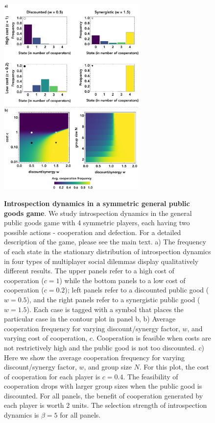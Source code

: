 \documentclass[11pt]{article}
\theoremstyle{plainCl1}
\theoremstyle{plainCl2}
\begin{document}
\clearpage
\begin{figure}
\centering
\includegraphics[width =  0.65\textwidth, keepaspectratio]{figures/figure3.eps}~\\[0.4cm]
\caption{\onehalfspacing
\textbf{Introspection dynamics in a symmetric general public goods game}. We study introspection dynamics in the general public goods game with 4 symmetric players, each having two possible actions - cooperation and defection. For a detailed description of the game, please see the main text. a) The frequency of each state in the stationary distribution of introspection dynamics in four types of multiplayer social dilemmas display qualitatively different results. The upper panels refer to a high cost of cooperation ($c=1$) while the bottom panels to a low cost of cooperation ($c = 0.2$); left panels refer to a discounted public good ($w = 0.5$), and the right panels refer to a synergistic public good ($w = 1.5$). Each case is tagged with a symbol that places the particular case in the contour plot in panel b, b) Average cooperation frequency for varying discount/synergy factor, $w$, and varying cost of cooperation, $c$. Cooperation is feasible when costs are not restrictively high and the public good is not too discounted. c) Here we show the average cooperation frequency for varying discount/synergy factor, $w$, and group size $N$. For this plot, the cost of cooperation for each player is $c = 0.4$. The feasibility of cooperation drops with larger group sizes when the public good is discounted. For all panels, the benefit of cooperation generated by each player is worth 2 units. The selection strength of introspection dynamics is $\beta = 5$ for all panels.} 
\label{Fig:GPGG-symmetric}
\end{figure}
\end{document}
